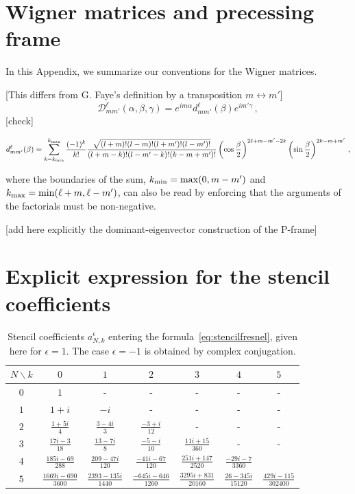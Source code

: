 \documentclass[aps,showpacs,twocolumn,
prd,superscriptaddress,nofootinbib]{revtex4-1}
\newcommand{\be}{\begin{equation}}
\newcommand{\ee}{\end{equation}}
\newcommand\calD{{\mathcal{D}}}
\newcommand{\SM}[1]{{\color{Red} #1}}
\begin{document}

\section{Wigner matrices and precessing frame}
\label{app:wigner}

In this Appendix, we summarize our conventions for the Wigner matrices.

\SM{[This differs from G. Faye's definition by a transposition $m\leftrightarrow m'$]}
\be\label{eq:defWignerDapp}
	\calD^{\ell}_{mm'} (\alpha, \beta, \gamma) = e^{im \alpha} d^{\ell}_{mm'}(\beta) e^{im' \gamma}\,,
\ee
\SM{[check]}
\begin{widetext}
\be\label{eq:defWignerdapp}
	d^{\ell}_{mm'}(\beta) = \sum\limits_{k=k_{\rm min}}^{k_{\rm max}} \frac{(-1)^{k}}{k!} \frac{\sqrt{(l+m)! (l-m)! (l+m')! (l-m')!}}{(l+m-k)! (l-m'-k)! (k-m+m')!} \left( \cos\frac{\beta}{2} \right)^{2\ell+m-m'-2k} \left( \sin\frac{\beta}{2} \right)^{2k-m+m'}\,,
\ee
\end{widetext}
where the boundaries of the sum, $k_{\rm min} = \mathrm{max}(0, m-m')$ and $k_{\rm max} = \mathrm{min}(\ell+m, \ell-m')$, can also be read by enforcing that the arguments of the factorials must be non-negative.

\SM{[add here explicitly the dominant-eigenvector construction of the P-frame]}

\section{Explicit expression for the stencil coefficients}
\label{app:stencil}

\begin{table}[t]
\begin{ruledtabular}\caption{Stencil coefficients $a_{N,k}^{\epsilon}$ entering the formula~\eqref{eq:stencilfresnel}, given here for $\epsilon=1$. The case $\epsilon=-1$ is obtained by complex conjugation.}\label{table:stencil}
\begin{tabular}{c|cccccc}
	$N \backslash k$ & $0$ & $1$ & $2$ & $3$ & $4$ & $5$ \\
	\hline
	$0$ & $1$ & - & - & - & - & - \\
	$1$ & $1+i$ & $-i$ & - & - & - & - \\
	$2$ & $\frac{1+5i}{4}$ & $\frac{3-4i}{3}$ & $\frac{-3+i}{12}$ & - & - & - \\
	$3$ & $\frac{17 i-3}{18}$ & $\frac{13-7 i}{8}$ & $\frac{-5-i}{10}$ & $\frac{11 i+15}{360}$ & - & - \\
	$4$ & $\frac{185 i-69}{288}$ & $\frac{209-47 i}{120}$ & $\frac{-41 i-67}{120}$ & $\frac{251 i+147}{2520}$ & $\frac{-29 i-7}{3360}$ & \\
	$5$ & $\frac{1669 i-690}{3600}$ & $\frac{2393-135 i}{1440}$ & $\frac{-645 i-646}{1260}$ & $\frac{3295 i+831}{20160}$ & $\frac{26-345 i}{15120}$ & $\frac{429 i-115}{302400}$ \\
\end{tabular}
\end{ruledtabular}
\end{table}
\end{document}

